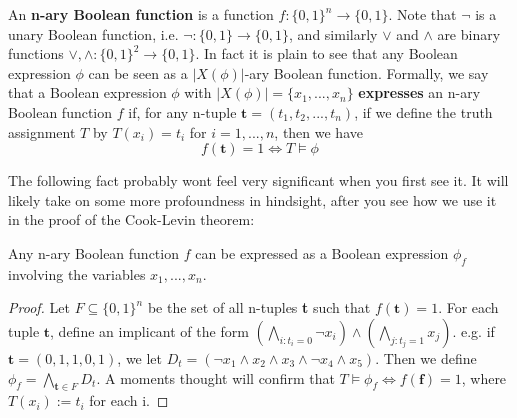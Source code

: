 \begin{definition}
An \textbf{n-ary Boolean function} is a function $f:\{0,1\}^n \to \{0,1\}$. Note that $\neg$ is a unary Boolean function, i.e. $\neg:\{0,1\} \to \{0,1\}$, and similarly $\vee$ and $\wedge$ are binary functions $\vee,\wedge:\{0,1\}^2 \to \{0,1\}$. In fact it is plain to see that any Boolean expression $\phi$ can be seen as a $|X(\phi)|$-ary Boolean function. Formally, we say that a Boolean expression $\phi$ with $|X(\phi)|=\{x_1,...,x_n\}$ \textbf{expresses} an n-ary Boolean function $f$ if, for any n-tuple $\textbf{t} = (t_1,t_2,...,t_n)$, if we define the truth assignment $T$ by $T(x_i)=t_i$ for $i=1,...,n$, then we have 
\[f(\textbf{t}) = 1 \iff T \models \phi \]
\end{definition}
The following fact probably wont feel very significant when you first see it. It will likely take on some more profoundness in hindsight, after you see how we use it in the proof of the Cook-Levin theorem:
\begin{fact}
    Any n-ary Boolean function $f$ can be expressed as a Boolean expression $\phi_f$ involving the variables $x_1,...,x_n$.
\end{fact}
\begin{proof}
    Let $F \subseteq \{0,1\}^n$ be the set of all n-tuples \textbf{t} such that $f(\textbf{t}) = 1$. For each tuple $\textbf{t}$, define an implicant of the form $(\underset{i:t_i=0}{\bigwedge}\neg x_i) \wedge (\underset{j:t_j=1}{\bigwedge} x_j)$. e.g. if $\textbf{t}=(0,1,1,0,1)$, we let $D_t = (\neg x_1 \wedge x_2 \wedge x_3 \wedge \neg x_4 \wedge x_5)$. Then we define $\phi_f = \underset{\textbf{t} \in F}{\bigwedge}D_t$. A moments thought will confirm that $T \models \phi_f \iff f(\textbf{f})=1$, where $T(x_i) := t_i$ for each i.
\end{proof}
